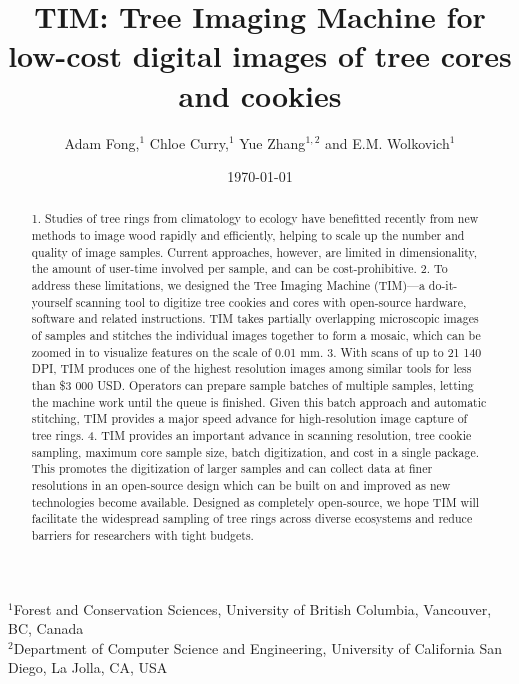 \documentclass[a4paper,12pt]{article}
\title{TIM: Tree Imaging Machine for low-cost digital images of tree cores and cookies}
\author{Adam Fong,$^{1}$ Chloe Curry,$^{1}$ Yue Zhang$^{1, 2}$ and E.M. Wolkovich$^{1}$} %
\date{\today}
\begin{document}
\maketitle

\noindent $^{1}$Forest and Conservation Sciences, University of British Columbia, Vancouver, BC, Canada\\
$^{2}$Department of Computer Science and Engineering, University of California San Diego, La Jolla, CA, USA\\ 


\begin{abstract}  
1.  Studies of tree rings from climatology to ecology have benefitted recently from new methods to image wood rapidly and efficiently, helping to scale up the number and quality of image samples. Current approaches, however, are limited in dimensionality, the amount of user-time involved per sample, and can be cost-prohibitive. %
2.  To address these limitations, we designed the Tree Imaging Machine (TIM)---a do-it-yourself scanning tool to digitize tree cookies and cores with open-source hardware, software and related instructions. %
TIM takes partially overlapping microscopic images of samples and stitches the individual images together to form 
a mosaic, which can be zoomed in to visualize features on the scale of 0.01 mm. 
3. With scans of up to 21 140 DPI, TIM produces one of the highest resolution images among similar tools for less than \$3 000 USD. Operators can prepare sample batches of multiple samples, letting the machine work until the queue is finished. Given this batch approach and automatic stitching, TIM provides a major speed advance for high-resolution image capture of tree rings. 
4. TIM provides an important advance in scanning resolution, tree cookie sampling, maximum core sample size, batch digitization, and cost in a single package. This promotes the digitization of larger samples and can collect data at finer resolutions in an open-source design which can be built on and improved as new technologies become available. Designed as completely open-source, we hope TIM will facilitate the widespread sampling of tree rings across diverse ecosystems and reduce barriers for researchers with tight budgets. 

\end{abstract}
\end{document}
